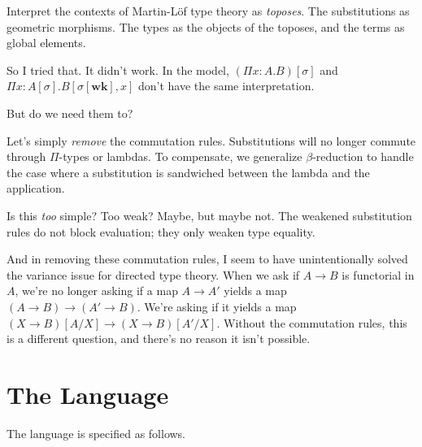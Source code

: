 \documentclass{article}
\begin{document}
Interpret the contexts of Martin-L\"of type theory as \emph{toposes}. The substitutions as geometric morphisms.
The types as the objects of the toposes, and the terms as global elements.

So I tried that. It didn't work. In the model, \((\Pi x : A. B)[\sigma]\)
and \(\Pi x : A[\sigma]. B[\sigma[\mathbf{wk}], x]\) don't have the same interpretation.

But do we need them to?

Let's simply \emph{remove} the commutation rules.
Substitutions will no longer commute through \(\Pi\)-types or lambdas.
To compensate, we generalize \(\beta\)-reduction to handle the case
where a substitution is sandwiched between the lambda and the application.

Is this \emph{too} simple? Too weak? Maybe, but maybe not.
The weakened substitution rules do not block evaluation;
they only weaken type equality.

And in removing these commutation rules,
I seem to have unintentionally solved the variance issue for directed type theory.
When we ask if \(A \to B\) is functorial in \(A\), we're no longer asking
if a map \(A \to A'\) yields a map \((A \to B) \to (A' \to B)\).
We're asking if it yields a map \((X \to B)[A/X] \to (X \to B)[A'/X]\).
Without the commutation rules, this is a different question,
and there's no reason it isn't possible.

\section{The Language}

\newcommand{\Cx}{\mathsf{Cx}}
\newcommand{\Sb}{\mathsf{Sb}}
\newcommand{\Ty}{\mathsf{Ty}}
\newcommand{\Tm}{\mathsf{Tm}}

The language is specified as follows.
\end{document}

